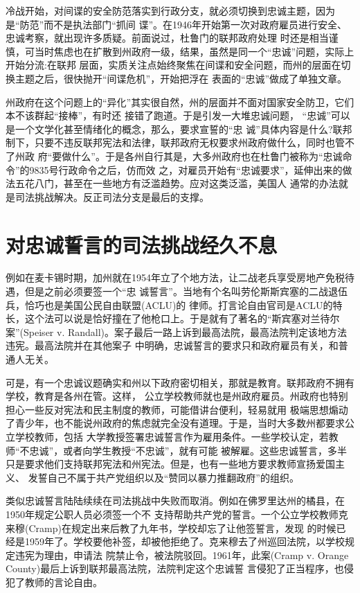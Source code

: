 \documentclass[10pt]{article}
\begin{document}
{冷战开始，对间谍的安全防范落实到行政分支，就必须切换到忠诚主题，因为是``防范''而不是执法部门``抓间
谍''。在1946年开始第一次对政府雇员进行安全、忠诚考察，就出现许多质疑。前面说过，杜鲁门的联邦政府处理
时还是相当谨慎，可当时焦虑也在扩散到州政府一级，结果，虽然是同一个``忠诚''问题，实际上开始分流:在联邦
层面，实质关注点始终聚焦在间谍和安全问题，而州的层面在切换主题之后，很快抛开``间谍危机''，开始把浮在
表面的``忠诚''做成了单独文章。

州政府在这个问题上的``异化''其实很自然，州的层面并不面对国家安全防卫，它们本不该群起``接棒''，有时还
接错了跑道。于是引发一大堆忠诚问题， ``忠诚''可以是一个文学化甚至情绪化的概念，那么，要求宣誓的``忠
诚''具体内容是什么?联邦制下，只要不违反联邦宪法和法律，联邦政府无权要求州政府做什么，同时也管不了州政
府``要做什么''。于是各州自行其是，大多州政府也在杜鲁门被称为``忠诚命令''的9835号行政命令之后，仿而效
之，对雇员开始有``忠诚要求''，延伸出来的做法五花八门，甚至在一些地方有泛滥趋势。应对这类泛滥，美国人
通常的办法就是司法挑战解决。反正司法分支是最后的支撑。

\pagebreak
\section{对忠诚誓言的司法挑战经久不息}

例如在麦卡锡时期，加州就在1954年立了个地方法，让二战老兵享受房地产免税待遇，但是之前必须要签一个``忠
诚誓言''。当地有个名叫劳伦斯\textperiodcentered 斯宾塞的二战退伍兵，恰巧也是美国公民自由联盟(ACLU)的
律师。打言论自由官司是ACLU的特长，这个法可以说是恰好撞在了他枪口上。于是就有了著名的``斯宾塞对兰待尔
案''(Speiser v. Randall)。案子最后一路上诉到最高法院，最高法院判定该地方法违宪。最高法院并在其他案子
中明确，忠诚誓言的要求只和政府雇员有关，和普通人无关。

可是，有一个忠诚议题确实和州以下政府密切相关，那就是教育。联邦政府不拥有学校，教育是各州在管。这样，
公立学校教师就也是州政府雇员。州政府也特别担心一些反对宪法和民主制度的教师，可能借讲台便利，轻易就用
极端思想煽动了青少年，也不能说州政府的焦虑就完全没有道理。于是，当时大多数州都要求公立学校教师，包括
大学教授签署忠诚誓言作为雇用条件。一些学校认定，若教师``不忠诚''，或者向学生教授``不忠诚''，就有可能
被解雇。这些忠诚誓言，多半只是要求他们支持联邦宪法和州宪法。但是，也有一些地方要求教师宣扬爱国主义、
发誓自己不属于共产党组织以及``赞同以暴力推翻政府''的组织。

类似忠诚誓言陆陆续续在司法挑战中失败而取消。例如在佛罗里达州的橘县，在1950年规定公职人员必须签一个不
支持帮助共产党的誓言。一个公立学校教师克来穆(Cramp)在规定出来后教了九年书，学校却忘了让他签誓言，发现
的时候已经是1959年了。学校要他补签，却被他拒绝了。克来穆去了州巡回法院，以学校规定违宪为理由，申请法
院禁止令，被法院驳回。1961年，此案(Cramp v. Orange County)最后上诉到联邦最高法院，法院判定这个忠诚誓
言侵犯了正当程序，也侵犯了教师的言论自由。

}
\end{document}
